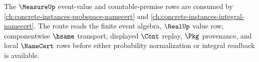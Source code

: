The $\MeasureUp$ event-value and countable-premise rows are consumed by \autoref{ch:concrete-instances-probspace-namecert} and \autoref{ch:concrete-instances-integral-namecert}. The route reads the finite event algebra, $\RealUp$ value row, componentwise $\hsame$ transport, displayed $\Cont$ replay, $\Pkg$ provenance, and local $\NameCert$ rows before either probability normalization or integral readback is available.
